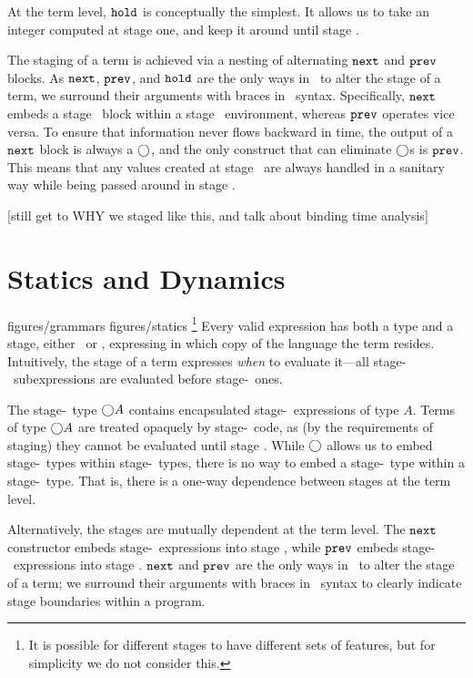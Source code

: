 At the term level, ${\tt hold}$ is conceptually the simplest.
It allows us to take an integer computed at stage one, and keep it around until stage \bbtwo.

The staging of a term is achieved via a nesting of alternating ${\tt next}$ and ${\tt prev}$ blocks.  
As ${\tt next}$, ${\tt prev}$, and ${\tt hold}$ are the only ways in \lang\ to alter the stage of a term,
we surround their arguments with braces in \lang\ syntax.
Specifically, ${\tt next}$ embeds a stage \bbtwo\ block within a stage \bbone\ environment,
whereas ${\tt prev}$ operates vice versa.
To ensure that information never flows backward in time, 
the output of a ${\tt next}$ block is always a $\bigcirc$,
and the only construct that can eliminate $\bigcirc$s is ${\tt prev}$.
This means that any values created at stage \bbtwo\ are always handled in a sanitary way while being passed around in stage \bbone.

[still get to WHY we staged like this, and talk about binding time analysis]

\section{Statics and Dynamics}
\label{sec:semantics}

 {figures/grammars}
 {figures/statics}
%
\footnote{It is possible for different stages to have different sets of
features, but for simplicity we do not consider this.}
Every valid expression has both a type and a stage, either \bbone~or \bbtwo,
expressing in which copy of the language the term resides. Intuitively, the
stage of a term expresses \emph{when} to evaluate it---all stage-\bbone\
subexpressions are evaluated before stage-\bbtwo\ ones.

The stage-\bbone\ type $\bigcirc A$ contains encapsulated
stage-\bbtwo\ expressions of type $A$. Terms of type $\bigcirc A$ are treated
opaquely by stage-\bbone\ code, as (by the requirements of staging) they cannot be evaluated until stage \bbtwo.
While $\bigcirc$ allows us to embed stage-\bbtwo\ types within stage-\bbone\ types,
there is no way to embed a stage-\bbone\ type within a stage-\bbtwo\ type.
That is, there is a one-way dependence between stages at the term level.

Alternatively, the stages are mutually dependent at the term level.
The ${\tt next}$ constructor embeds stage-\bbtwo\ expressions into stage \bbone,
while ${\tt prev}$ embeds stage-\bbone\ expressions into stage \bbtwo.  ${\tt next}$ and ${\tt prev}$ are the
only ways in \lang\ to alter the stage of a term; we surround their arguments
with braces in \lang\ syntax to clearly indicate stage boundaries within a
program.


